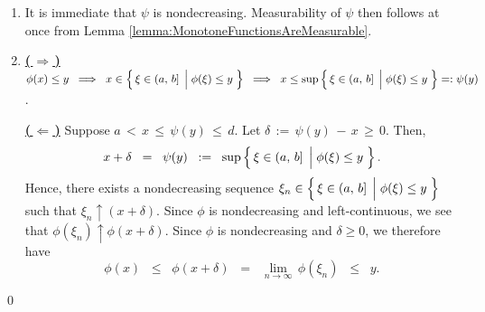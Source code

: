 \begin{enumerate}
\item
	It is immediate that $\psi$ is nondecreasing.
	Measurability of $\psi$ then follows at once from Lemma \ref{lemma:MonotoneFunctionsAreMeasurable}.
\item
	\textbf{\underline{(\,$\Longrightarrow$\,)}}\quad
	$\phi(x) \leq y
	\;\;\Longrightarrow\;\;
		x \in \left\{\,\xi\in(a,\,b] \;\left\vert\; \phi(\xi) \overset{{\color{white}.}}{\leq} y\right.\,\right\}
	\;\; \Longrightarrow \;\;
		x \leq \sup\left\{\,\xi\in(a,\,b] \;\left\vert\; \phi(\xi) \overset{{\color{white}.}}{\leq} y\right.\,\right\} =: \psi(y)$.

	\vskip 0.2cm
	\noindent
	\textbf{\underline{(\,$\Longleftarrow$\,)}}\quad
	Suppose \;$a \,<\, x \,\leq\, \psi(y) \,\leq\, d$.\;
	Let \;$\delta \,:=\, \psi(y) \,-\, x \,\geq\, 0$. Then,
	\begin{equation*}
	x + \delta \;\;=\;\; \psi(y) \;\;:=\;\; \sup\left\{\,\xi\in(a,\,b] \;\left\vert\; \phi(\xi) \overset{{\color{white}.}}{\leq} y\right.\,\right\}.
	\end{equation*}
	Hence, there exists a nondecreasing sequence
	$\xi_{n} \in \left\{\,\xi\in(a,\,b] \;\left\vert\; \phi(\xi) \overset{{\color{white}.}}{\leq} y\right.\,\right\}$
	such that $\xi_{n} \uparrow (x+\delta)$.
	Since $\phi$ is {\color{red}nondecreasing and left-continuous}, we see that $\phi(\xi_{n}) \uparrow \phi(x+\delta)$.
	Since $\phi$ is nondecreasing and $\delta \geq 0$, we therefore have
	\begin{equation*}
	\phi(x) \;\;\leq\;\; \phi(x+\delta) \;\;=\;\; \underset{n\rightarrow\infty}{\lim}\,\phi(\xi_{n}) \;\;\leq\;\; y.
	\end{equation*}
\end{enumerate}
\qed


